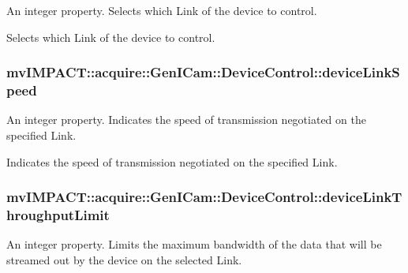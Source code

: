 An integer property. Selects which Link of the device to control. 

Selects which Link of the device to control. \hypertarget{classmv_i_m_p_a_c_t_1_1acquire_1_1_gen_i_cam_1_1_device_control_aa266deca5b9087f6f9ad1413bdff8b2b}{
\subsubsection[{device\+Link\+Speed}]{ mv\+I\+M\+P\+A\+C\+T\+::acquire\+::\+Gen\+I\+Cam\+::\+Device\+Control\+::device\+Link\+Speed}}\label{classmv_i_m_p_a_c_t_1_1acquire_1_1_gen_i_cam_1_1_device_control_aa266deca5b9087f6f9ad1413bdff8b2b}


An integer property. Indicates the speed of transmission negotiated on the specified Link. 

Indicates the speed of transmission negotiated on the specified Link. \hypertarget{classmv_i_m_p_a_c_t_1_1acquire_1_1_gen_i_cam_1_1_device_control_a270167ff893fedfc0e457f880f061d90}{
\subsubsection[{device\+Link\+Throughput\+Limit}]{ mv\+I\+M\+P\+A\+C\+T\+::acquire\+::\+Gen\+I\+Cam\+::\+Device\+Control\+::device\+Link\+Throughput\+Limit}}\label{classmv_i_m_p_a_c_t_1_1acquire_1_1_gen_i_cam_1_1_device_control_a270167ff893fedfc0e457f880f061d90}


An integer property. Limits the maximum bandwidth of the data that will be streamed out by the device on the selected Link. 

